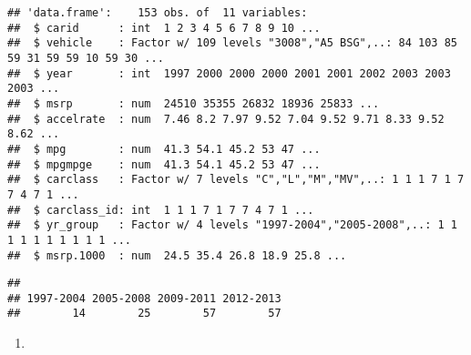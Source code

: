 \documentclass[]{article}
\newenvironment{Shaded}{\begin{snugshade}}{\end{snugshade}}
\newcommand{\KeywordTok}[1]{\textcolor[rgb]{0.13,0.29,0.53}{\textbf{#1}}}
\newcommand{\NormalTok}[1]{#1}
\newcommand{\OperatorTok}[1]{\textcolor[rgb]{0.81,0.36,0.00}{\textbf{#1}}}
\begin{document}
\begin{verbatim}
## 'data.frame':    153 obs. of  11 variables:
##  $ carid      : int  1 2 3 4 5 6 7 8 9 10 ...
##  $ vehicle    : Factor w/ 109 levels "3008","A5 BSG",..: 84 103 85 59 31 59 59 10 59 30 ...
##  $ year       : int  1997 2000 2000 2000 2001 2001 2002 2003 2003 2003 ...
##  $ msrp       : num  24510 35355 26832 18936 25833 ...
##  $ accelrate  : num  7.46 8.2 7.97 9.52 7.04 9.52 9.71 8.33 9.52 8.62 ...
##  $ mpg        : num  41.3 54.1 45.2 53 47 ...
##  $ mpgmpge    : num  41.3 54.1 45.2 53 47 ...
##  $ carclass   : Factor w/ 7 levels "C","L","M","MV",..: 1 1 1 7 1 7 7 4 7 1 ...
##  $ carclass_id: int  1 1 1 7 1 7 7 4 7 1 ...
##  $ yr_group   : Factor w/ 4 levels "1997-2004","2005-2008",..: 1 1 1 1 1 1 1 1 1 1 ...
##  $ msrp.1000  : num  24.5 35.4 26.8 18.9 25.8 ...
\end{verbatim}

\begin{Shaded}
\end{Shaded}

\begin{verbatim}
## 
## 1997-2004 2005-2008 2009-2011 2012-2013 
##        14        25        57        57
\end{verbatim}

\begin{enumerate}
\def\labelenumi{\alph{enumi})}
\setcounter{enumi}{1}
\item
\end{enumerate}
\end{document}
